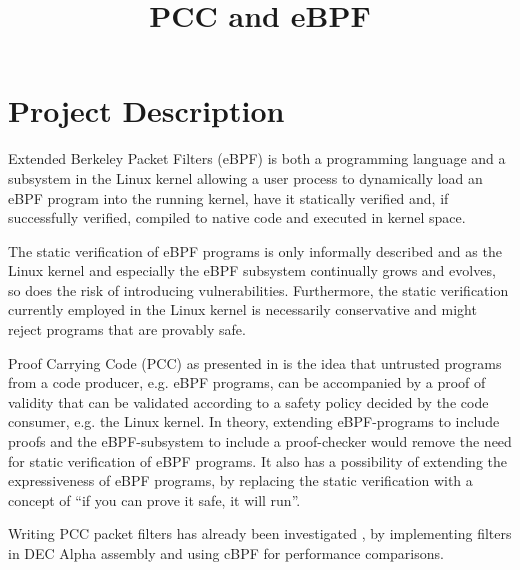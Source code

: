 \documentclass[12pt, a4paper, titlepage, oneside]{article}
\begin{document}
\newcommand{\thetitle}{PCC and eBPF}
\title{\thetitle}

\maketitle              %


\section*{Project Description}

Extended Berkeley Packet Filters (eBPF) is both a programming language and a subsystem in the Linux kernel allowing a user process to dynamically load an eBPF program into the running kernel, have it statically verified and, if successfully verified, compiled to native code and executed in kernel space.

The static verification of eBPF programs is only informally described and as the Linux kernel and especially the eBPF subsystem continually grows and evolves, so does the risk of introducing vulnerabilities. Furthermore, the static verification currently employed in the Linux kernel is necessarily conservative and might reject programs that are provably safe. 

Proof Carrying Code (PCC) as presented in \cite{pcc-necula} is the idea that untrusted programs from a code producer, e.g. eBPF programs, can be accompanied by a proof of validity that can be validated according to a safety policy decided by the code consumer, e.g. the Linux kernel. 
In theory, extending eBPF-programs to include proofs and the eBPF-subsystem to include a proof-checker would remove the need for static verification of eBPF programs. It also has a possibility of extending the expressiveness of eBPF programs, by replacing the static verification with a concept of ``if you can prove it safe, it will run''. 


Writing PCC packet filters has already been investigated \cite{kernel-ext-necula}, by implementing filters in DEC Alpha assembly and using cBPF for performance comparisons.
\end{document}
